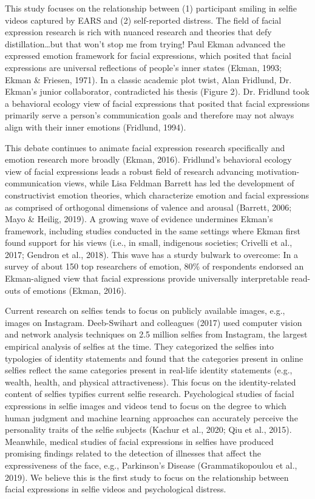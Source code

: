 \documentclass[authordate, empirical]{jote-new-article}
\begin{document}
This study focuses on the relationship between (1) participant smiling in selfie videos captured by EARS and (2) self-reported distress. The field of facial expression research is rich with nuanced research and theories that defy distillation…but that won't stop me from trying! Paul Ekman advanced the expressed emotion framework for facial expressions, which posited that facial expressions are universal reflections of people's inner states (Ekman, 1993; Ekman \& Friesen, 1971). In a classic academic plot twist, Alan Fridlund, Dr. Ekman's junior collaborator, contradicted his thesis (Figure 2). Dr. Fridlund took a behavioral ecology view of facial expressions that posited that facial expressions primarily serve a person's communication goals and therefore may not always align with their inner emotions (Fridlund, 1994).



This debate continues to animate facial expression research specifically and emotion research more broadly (Ekman, 2016). Fridlund's behavioral ecology view of facial expressions leads a robust field of research advancing motivation-communication views, while Lisa Feldman Barrett has led the development of constructivist emotion theories, which characterize emotion and facial expressions as comprised of orthogonal dimensions of valence and arousal (Barrett, 2006; Mayo \& Heilig, 2019). A growing wave of evidence undermines Ekman's framework, including studies conducted in the same settings where Ekman first found support for his views (i.e., in small, indigenous societies; Crivelli et al., 2017; Gendron et al., 2018). This wave has a sturdy bulwark to overcome: In a survey of about 150 top researchers of emotion, 80\% of respondents endorsed an Ekman-aligned view that facial expressions provide universally interpretable read-outs of emotions (Ekman, 2016).



Current research on selfies tends to focus on publicly available images, e.g., images on Instagram. Deeb-Swihart and colleagues (2017) used computer vision and network analysis techniques on 2.5 million selfies from Instagram, the largest empirical analysis of selfies at the time. They categorized the selfies into typologies of identity statements and found that the categories present in online selfies reflect the same categories present in real-life identity statements (e.g., wealth, health, and physical attractiveness). This focus on the identity-related content of selfies typifies current selfie research. Psychological studies of facial expressions in selfie images and videos tend to focus on the degree to which human judgment and machine learning approaches can accurately perceive the personality traits of the selfie subjects (Kachur et al., 2020; Qiu et al., 2015). Meanwhile, medical studies of facial expressions in selfies have produced promising findings related to the detection of illnesses that affect the expressiveness of the face, e.g., Parkinson's Disease (Grammatikopoulou et al., 2019). We believe this is the first study to focus on the relationship between facial expressions in selfie videos and psychological distress.
\end{document}
